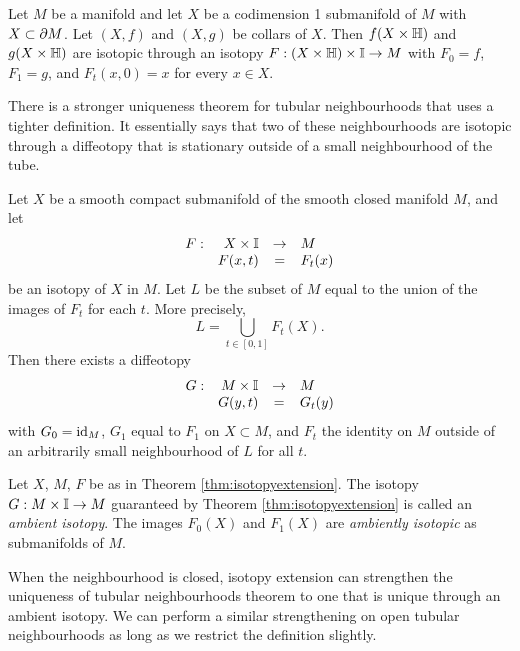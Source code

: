 \begin{theorem}
	Let $M$ be a manifold and let $X$ be a codimension 1 submanifold of $M$ with $X\subset \partial M$.
	Let $(X,f)$ and $(X,g)$ be collars of $X$.
	Then $f(X\times\mathbb{H})$ and $g(X\times\mathbb{H})$ are isotopic through an isotopy $F:(X\times\mathbb{H})\times\mathbb{I}\to M$ with $F_0=f$, $F_1=g$, and $F_t(x,0)=x$ for every $x\in X$.	
\end{theorem}

There is a stronger uniqueness theorem for tubular neighbourhoods that uses a tighter definition.
It essentially says that two of these neighbourhoods are isotopic through a diffeotopy that is stationary outside of a small neighbourhood of the tube.

\begin{theorem}
	\label{thm:isotopyextension}
	Let $X$ be a smooth compact submanifold of the smooth closed manifold $M$, and let
	\[
		\begin{array}{crcl}
			F: & X\times\mathbb{I} & \to & M \\
			   & F(x,t) & = & F_t(x)
		\end{array}
	\]
	be an isotopy of $X$ in $M$.
	Let $L$ be the subset of $M$ equal to the union of the images of $F_t$ for each $t$.
	More precisely,
	\[
		L = \bigcup_{t\in[0,1]} F_t(X).
	\]
	Then there exists a diffeotopy 
	\[
		\begin{array}{crcl}
			G: & M\times\mathbb{I} & \to & M \\
			   & G(y,t) & = & G_t(y)				
		\end{array}
	\]
	with $G_0=\textrm{id}_{M}$, $G_1$ equal to $F_1$ on $X\subset M$, and $F_t$ the identity on $M$ outside of an arbitrarily small neighbourhood of $L$ for all $t$.
\end{theorem}

\begin{defn}
	\label{def:ambientisotopy}
	Let $X$, $M$, $F$ be as in Theorem \ref{thm:isotopyextension}.
	The isotopy $G:M\times\mathbb{I}\to M$ guaranteed by Theorem \ref{thm:isotopyextension} is called an \emph{ambient isotopy}.
	The images $F_0(X)$ and $F_1(X)$ are \emph{ambiently isotopic} as submanifolds of $M$.
\end{defn}

When the neighbourhood is closed, isotopy extension can strengthen the uniqueness of tubular neighbourhoods theorem to one that is unique through an ambient isotopy.
We can perform a similar strengthening on open tubular neighbourhoods as long as we restrict the definition slightly.

